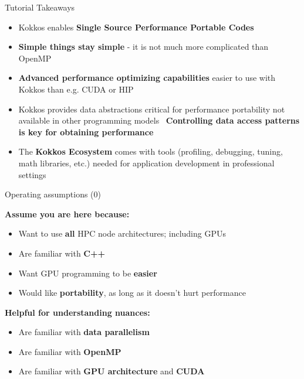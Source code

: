 
\begin{frame}{Tutorial Takeaways}

  \begin{itemize}
  \item {Kokkos enables \textbf{Single Source Performance Portable Codes}}
  \item {\textbf{Simple things stay simple} - it is not much more complicated than OpenMP}
  \item {\textbf{Advanced performance optimizing capabilities} easier to use with Kokkos than e.g. CUDA or HIP}
  \item {Kokkos provides data abstractions critical for performance portability not available in other programming models \
         \textbf{Controlling data access patterns is key for obtaining performance} }
 \item The \textbf{Kokkos Ecosystem} comes with tools (profiling, debugging, tuning, math libraries, etc.) needed for application development in professional settings
  \end{itemize}

\end{frame}


\begin{frame}{Operating assumptions (0)}

  \textbf{Assume you are here because:}
  \begin{itemize}
    \item {Want to use \textbf{all} HPC node architectures; including GPUs}
    \item {Are familiar with \textbf{C++}}
    \item {Want GPU programming to be \textbf{easier}}
    \item {Would like \textbf{portability}, as long as it doesn't hurt performance}
  \end{itemize}
  \textbf{Helpful for understanding nuances:}
  \begin{itemize}
    \item {Are familiar with \textbf{data parallelism}}
    \item {Are familiar with \textbf{OpenMP}}
    \item {Are familiar with \textbf{GPU architecture} and \textbf{CUDA}}
  \end{itemize}

\end{frame}


